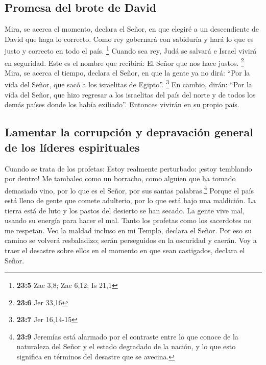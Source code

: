 \hypertarget{promesa-del-brote-de-david}{%
\subsection{Promesa del brote de
David}\label{promesa-del-brote-de-david}}

 Mira, se acerca el momento, declara el Señor, en que
elegiré a un descendiente de David que haga lo correcto. Como rey
gobernará con sabiduría y hará lo que es justo y correcto en todo el
país. \footnote{\textbf{23:5} Zac 3,8; Zac 6,12; Is 21,1} 
Cuando sea rey, Judá se salvará e Israel vivirá en seguridad. Este es el
nombre que recibirá: El Señor que nos hace justos. \footnote{\textbf{23:6}
  Jer 33,16}  Mira, se acerca el tiempo, declara el Señor,
en que la gente ya no dirá: ``Por la vida del Señor, que sacó a los
israelitas de Egipto''. \footnote{\textbf{23:7} Jer 16,14-15}
 En cambio, dirán: ``Por la vida del Señor, que hizo
regresar a los israelitas del país del norte y de todos los demás países
donde los había exiliado''. Entonces vivirán en su propio país.

\hypertarget{lamentar-la-corrupciuxf3n-y-depravaciuxf3n-general-de-los-luxedderes-espirituales}{%
\subsection{Lamentar la corrupción y depravación general de los líderes
espirituales}\label{lamentar-la-corrupciuxf3n-y-depravaciuxf3n-general-de-los-luxedderes-espirituales}}

 Cuando se trata de los profetas: Estoy realmente
perturbado: ¡estoy temblando por dentro! Me tambaleo como un borracho,
como alguien que ha tomado demasiado vino, por lo que es el Señor, por
sus santas palabras.\footnote{\textbf{23:9} Jeremías está alarmado por
  el contraste entre lo que conoce de la naturaleza del Señor y el
  estado degradado de la nación, y lo que esto significa en términos del
  desastre que se avecina.}  Porque el país está lleno de
gente que comete adulterio, por lo que está bajo una maldición. La
tierra está de luto y los pastos del desierto se han secado. La gente
vive mal, usando su energía para hacer el mal.  Tanto los
profetas como los sacerdotes no me respetan. Veo la maldad incluso en mi
Templo, declara el Señor.  Por eso su camino se volverá
resbaladizo; serán perseguidos en la oscuridad y caerán. Voy a traer el
desastre sobre ellos en el momento en que sean castigados, declara el
Señor.

